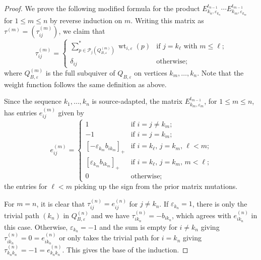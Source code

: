 \documentclass{amsart}
\numberwithin{theorem}{section}
\newcommand{\cP}{\mathcal{P}}
\newcommand{\wt}{{\operatorname{wt}}}
\begin{document}
  \begin{proof}
    We prove the following modified formula for the product $E^{t_{n-1}}_{k_n,\varepsilon_{k_n}}\cdots E^{t_{m-1}}_{k_m,\varepsilon_{k_m}}$ for $1\le m\le n$ by reverse induction on $m$.
    Writing this matrix as $\tau^{(m)}=(\tau^{(m)}_{ij})$, we claim that
    \begin{equation}
      \label{eq:tropical twist}
      \tau^{(m)}_{ij}=\begin{cases} \sum\limits_{p\in\cP_j(Q_{B,\varepsilon}^{(m)})}^* \wt_{i,\varepsilon}(p) & \text{if $j=k_\ell$ with $m\le\ell$;}\\ \delta_{ij} & \text{otherwise;} \end{cases}
    \end{equation}
    where $Q_{B,\varepsilon}^{(m)}$ is the full subquiver of $Q_{B,\varepsilon}$ on vertices $k_m,\ldots,k_n$.
    Note that the weight function follows the same definition as above.

    Since the sequence $k_1,\ldots,k_n$ is source-adapted, the matrix $E^{t_{m-1}}_{k_m,\varepsilon_m}$, for $1\le m\le n$, has entries $e^{(m)}_{ij}$ given by
    \begin{equation}
      \label{eq:source mutation matrix}
      e^{(m)}_{ij}=\begin{cases} 1 & \text{if $i=j\ne k_m$;}\\ -1 & \text{if $i=j=k_m$;}\\ [-\varepsilon_{k_m} b_{ik_m}]_+ & \text{if $i=k_\ell$, $j=k_m$, $\ell<m$;}\\ [\varepsilon_{k_m} b_{ik_m}]_+ & \text{if $i=k_\ell$, $j=k_m$, $m<\ell$;}\\ 0 & \text{otherwise;} \end{cases}
    \end{equation}
    the entries for $\ell<m$ picking up the sign from the prior matrix mutations.

    For $m=n$, it is clear that $\tau^{(n)}_{ij}=e^{(n)}_{ij}$ for $j\ne k_n$.
    If $\varepsilon_{k_n}=1$, there is only the trivial path $(k_n)$ in $Q_{B,\varepsilon}^{(n)}$ and we have $\tau^{(n)}_{ik_n}=-b_{ik_n}$, which agrees with $e^{(n)}_{ik_n}$ in this case.
    Otherwise, $\varepsilon_{k_n}=-1$ and the sum is empty for $i\ne k_n$ giving $\tau^{(n)}_{ik_n}=0=e^{(n)}_{ik_n}$ or only takes the trivial path for $i=k_n$ giving $\tau^{(n)}_{k_nk_n}=-1=e^{(n)}_{k_nk_n}$.
    This gives the base of the induction.


\end{proof}
\end{document}
